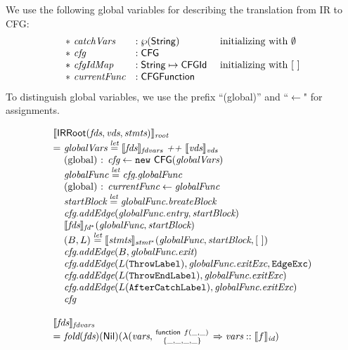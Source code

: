 We use the following global variables for describing the translation from IR to CFG:
\[
\begin{array}{lll}
*\ \emph{catchVars} &: \wp(\mbox{\textsf{String}}) & \text{ initializing with } \emptyset\\
*\ \emph{cfg} &: \mbox{\textsf{CFG}} &\\
*\ \emph{cfgIdMap} &: \mbox{\textsf{String}} \mapsto \mbox{\textsf{CFGId}} & \text{ initializing with } [\ ]\\
*\ \emph{currentFunc} &: \mbox{\textsf{CFGFunction}} & \\
\end{array}
\]
To distinguish global variables, we use the prefix ``(global)'' and ``$\leftarrow$" for assignments.

\[
\begin{array}{l@{}l@{~}l}
\lefteqn{\transfun{\IRRoot(\emph{fds}, \emph{vds}, \emph{stmts})}_{\emph{root}}}\\
& = & \emph{globalVars} \letval \transfun{\emph{fds}}_{\emph{fdvars}} ~\emph{++}~ \transfun{\emph{vds}}_{\emph{vds}} \\
& & \text{(global) : } \emph{cfg} \leftarrow \new\ \CFG(\emph{globalVars})\\
& & \emph{globalFunc} \letval \emph{cfg}.\emph{globalFunc}\\
& & \text{(global) : } \emph{currentFunc} \leftarrow \emph{globalFunc}\\
& & \emph{startBlock} \letval \emph{globalFunc}.\emph{breateBlock}\\
& & \emph{cfg}.\emph{addEdge}(\emph{globalFunc}.\emph{entry}, \emph{startBlock})\\
& & \transfun{\emph{fds}}_{\emph{fd}^*}(\emph{globalFunc}, \emph{startBlock})\\
& & (B, L) \letval \transfun{\emph{stmts}}_{\emph{stmt}^{*}}(\emph{globalFunc}, \emph{startBlock}, [\ ])\\
& & \emph{cfg}.\emph{addEdge}(B, \emph{globalFunc}.\emph{exit})\\
& & \emph{cfg}.\emph{addEdge}(L(\TT{ThrowLabel}), \emph{globalFunc}.\emph{exitExc}, \EdgeExc)\\
& & \emph{cfg}.\emph{addEdge}(L(\TT{ThrowEndLabel}), \emph{globalFunc}.\emph{exitExc})\\
& & \emph{cfg}.\emph{addEdge}(L(\TT{AfterCatchLabel}), \emph{globalFunc}.\emph{exitExc})\\
& & \emph{cfg}\\
& & \\

\lefteqn{\transfun{\emph{fds}}_{\emph{fdvars}}}\\
 & = &
\fold(\emph{fds})(\Nil)(\lambda(\emph{vars}, \irfundeclsmall{f}{\_}{\_}{\_}{\_}{\_}{\_} \Rightarrow \emph{vars} :: \transfun{f}_{\emph{id}})\\
& & \\


\end{array}\]
